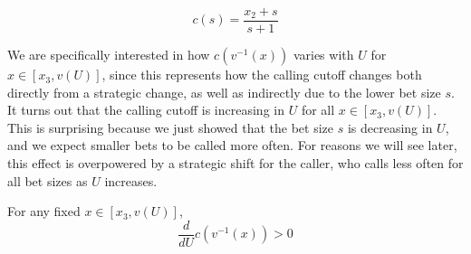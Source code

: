 \documentclass[../../main/main.tex]{subfiles}
\begin{document}
$$c(s) = \frac{x_2 + s}{s+1}$$

We are specifically interested in how $c(v^{-1}(x))$ varies with $U$ for $x \in [x_3, v(U)]$, since this represents how the calling cutoff changes both directly from a strategic change, as well as indirectly due to the lower bet size $s$. It turns out that the calling cutoff is increasing in $U$ for all $x \in [x_3, v(U)]$. This is surprising because we just showed that the bet size $s$ is decreasing in $U$, and we expect smaller bets to be called more often. For reasons we will see later, this effect is overpowered by a strategic shift for the caller, who calls less often for all bet sizes as $U$ increases. 

\begin{lemma}
    \label{lem:c_increasing}
    For any fixed $x \in [x_3, v(U)]$, 
    \[ 
        \frac{d}{dU} c(v^{-1}(x)) > 0
    \]
\end{lemma}
\end{document}
